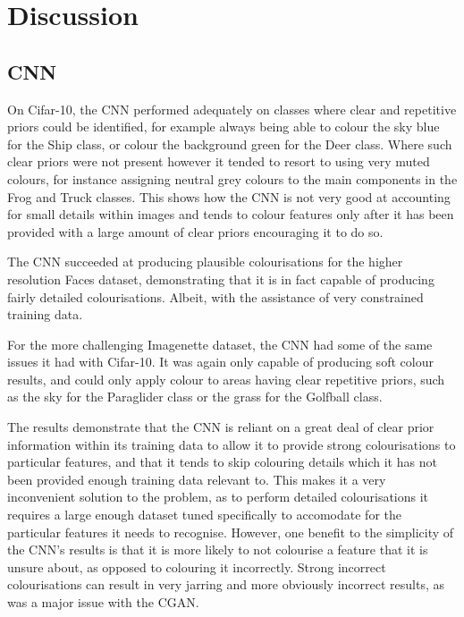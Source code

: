\documentclass{l4proj}
\begin{document}
\section{Discussion}

\subsection{CNN}

On Cifar-10, the CNN performed adequately on classes where clear and repetitive priors could be identified, for example always being able to colour the sky blue for the Ship class, or colour the background green for the Deer class. Where such clear priors were not present however it tended to resort to using very muted colours, for instance assigning neutral grey colours to the main components in the Frog and Truck classes. This shows how the CNN is not very good at accounting for small details within images and tends to colour features only after it has been provided with a large amount of clear priors encouraging it to do so. 

The CNN succeeded at producing plausible colourisations for the higher resolution Faces dataset, demonstrating that it is in fact capable of producing fairly detailed colourisations. Albeit, with the assistance of very constrained training data. 

For the more challenging Imagenette dataset, the CNN had some of the same issues it had with Cifar-10. It was again only capable of producing soft colour results, and could only apply colour to areas having clear repetitive priors, such as the sky for the Paraglider class or the grass for the Golfball class. 

The results demonstrate that the CNN is reliant on a great deal of clear prior information within its training data to allow it to provide strong colourisations to particular features, and that it tends to skip colouring details which it has not been provided enough training data relevant to. This makes it a very inconvenient solution to the problem, as to perform detailed colourisations it requires a large enough dataset tuned specifically to accomodate for the particular features it needs to recognise. However, one benefit to the simplicity of the CNN's results is that it is more likely to not colourise a feature that it is unsure about, as opposed to colouring it incorrectly. Strong incorrect colourisations can result in very jarring and more obviously incorrect results, as was a major issue with the CGAN.
\end{document}

